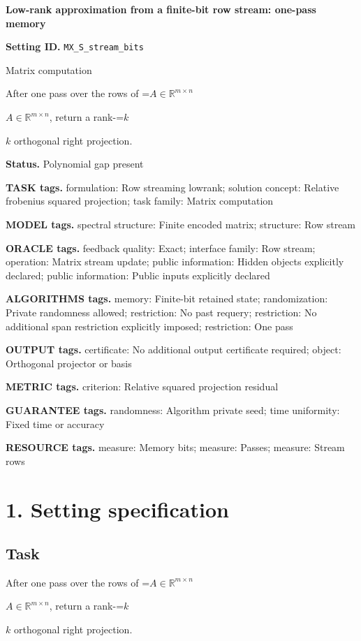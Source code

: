\documentclass[10pt,a4paper]{article}
\newcommand{\AtlasMath}[1]{\par\begingroup\centering\setbox0=\hbox{$\displaystyle #1$}\ifdim\wd0>1.4\linewidth\typeout{ATLAS WIDE FORMULA: \the\wd0}\fi\ifdim\wd0>\linewidth\resizebox{\linewidth}{!}{\box0}\else\box0\fi\par\endgroup}
\newcommand{\AtlasInlineMath}[1]{\begingroup\setbox0=\hbox{$#1$}\ifdim\wd0>.4\linewidth\endgroup\AtlasMath{#1}\else\endgroup$#1$\fi}
\begin{document}
\raggedright

{\LARGE\bfseries\sffamily\color{AtlasNavy} Low-rank approximation from a finite-bit row stream: one-pass memory\par}\vspace{5pt}
\textbf{Setting ID.} \texttt{MX\_\allowbreak{}\allowbreak{}S\_\allowbreak{}\allowbreak{}stream\_\allowbreak{}\allowbreak{}bits}

Matrix computation

After one pass over the rows of \AtlasInlineMath{A\in\mathbb{R}^{m\times n}}, return a rank-\AtlasInlineMath{k} orthogonal right projection.

\textbf{Status.} Polynomial gap present

\textbf{TASK tags.} formulation: Row streaming lowrank; solution concept: Relative frobenius squared projection; task family: Matrix computation

\textbf{MODEL tags.} spectral structure: Finite encoded matrix; structure: Row stream

\textbf{ORACLE tags.} feedback quality: Exact; interface family: Row stream; operation: Matrix stream update; public information: Hidden objects explicitly declared; public information: Public inputs explicitly declared

\textbf{ALGORITHMS tags.} memory: Finite-bit retained state; randomization: Private randomness allowed; restriction: No past requery; restriction: No additional span restriction explicitly imposed; restriction: One pass

\textbf{OUTPUT tags.} certificate: No additional output certificate required; object: Orthogonal projector or basis

\textbf{METRIC tags.} criterion: Relative squared projection residual

\textbf{GUARANTEE tags.} randomness: Algorithm private seed; time uniformity: Fixed time or accuracy

\textbf{RESOURCE tags.} measure: Memory bits; measure: Passes; measure: Stream rows

\section{1. Setting specification}
\subsection{Task}
After one pass over the rows of \AtlasInlineMath{A\in\mathbb{R}^{m\times n}}, return a rank-\AtlasInlineMath{k} orthogonal right projection.
\end{document}
